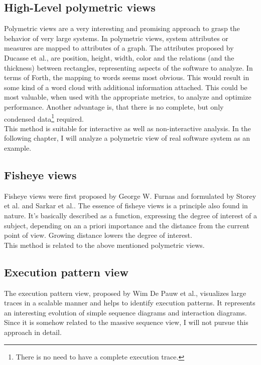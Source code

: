 \subsection*{High-Level polymetric views}
Polymetric views\cite{Ducasse:2004:HPV:977397.977739} are a very interesting and promising approach to grasp the behavior of very large systems. In polymetric views, system attributes or measures are mapped to attributes of a graph. The attributes proposed by Ducasse et al.\cite{Ducasse:2004:HPV:977397.977739}, are position, height, width, color and the relations (and the thickness) between rectangles, representing aspects of the software to analyze. In terms of Forth, the mapping to words seems most obvious. This would result in some kind of a word cloud with additional information attached. This could be most valuable, when used with the appropriate metrics, to analyze and optimize performance. Another advantage is, that there is no complete, but only condensed data\footnote{There is no need to have a complete execution trace.} required.
\\
This method is suitable for interactive as well as non-interactive analysis. In the following chapter, I will analyze a polymetric view of real software system as an example.

\subsection*{Fisheye views}
Fisheye views were first proposed by George W. Furnas\cite{Furnas:1986:GFV:22627.22342} and formulated by Storey et al.\cite{Storey:1995:GLA:647547.728600} and Sarkar et al.\cite{Sarkar:1994:GFV:198366.198384}. The essence of fisheye views is a principle also found in nature. It's basically described as a function, expressing the degree of interest of a subject, depending on an a priori importance and the distance from the current point of view. Growing distance lowers the degree of interest.
\\
This method is related to the above mentioned polymetric views.

\subsection*{Execution pattern view}
The execution pattern view, proposed by Wim De Pauw et al.\cite{Pauw98executionpatterns}, visualizes large traces in a scalable manner and helps to identify execution patterns. It represents an interesting evolution of simple sequence diagrams and interaction diagrams.
\\
Since it is somehow related to the massive sequence view, I will not pursue this approach in detail.

